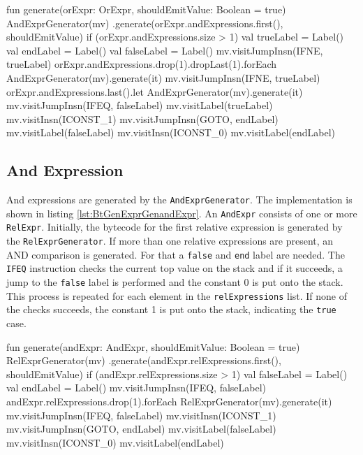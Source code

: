 \begin{KotlinCode}[float,numbers=none,caption=Implementation of the \texttt{generate} method of the \texttt{OrExprGenerator}., label=lst:BtGenExprGenOrExpr]
fun generate(orExpr: OrExpr, shouldEmitValue: Boolean = true) {
    AndExprGenerator(mv)
        .generate(orExpr.andExpressions.first(), shouldEmitValue)
    if (orExpr.andExpressions.size > 1) {
        val trueLabel = Label()
        val endLabel = Label()
        val falseLabel = Label()
        mv.visitJumpInsn(IFNE, trueLabel)
        orExpr.andExpressions.drop(1).dropLast(1).forEach {
            AndExprGenerator(mv).generate(it)
            mv.visitJumpInsn(IFNE, trueLabel)
        }
        orExpr.andExpressions.last().let {
            AndExprGenerator(mv).generate(it)
            mv.visitJumpInsn(IFEQ, falseLabel)
        }
        mv.visitLabel(trueLabel)
        mv.visitInsn(ICONST_1)
        mv.visitJumpInsn(GOTO, endLabel)
        mv.visitLabel(falseLabel)
        mv.visitInsn(ICONST_0)
        mv.visitLabel(endLabel)
    }
}
\end{KotlinCode}


\subsection{And Expression}

And expressions are generated by the \verb|AndExprGenerator|. The implementation is shown in listing \ref{lst:BtGenExprGenandExpr}. An \verb|AndExpr| consists of one or more \verb|RelExpr|. Initially, the bytecode for the first relative expression is generated by the \verb|RelExprGenerator|. If more than one relative expressions are present, an AND comparison is generated. For that a \verb|false| and \verb|end| label are needed. The \verb|IFEQ| instruction checks the current top value on the stack and if it succeeds, a jump to the \verb|false| label is performed and the constant 0 is put onto the stack. This process is repeated for each element in the \verb|relExpressions| list. If none of the checks succeeds, the constant 1 is put onto the stack, indicating the \verb|true| case. 

\begin{KotlinCode}[float,numbers=none,caption=Implementation of the \texttt{generate} method of the \texttt{AndExprGenerator}., label=lst:BtGenExprGenandExpr]
fun generate(andExpr: AndExpr, shouldEmitValue: Boolean = true) {
    RelExprGenerator(mv)
        .generate(andExpr.relExpressions.first(), shouldEmitValue)
    if (andExpr.relExpressions.size > 1) {
        val falseLabel = Label()
        val endLabel = Label()
        mv.visitJumpInsn(IFEQ, falseLabel)
        andExpr.relExpressions.drop(1).forEach {
            RelExprGenerator(mv).generate(it)
            mv.visitJumpInsn(IFEQ, falseLabel)
        }
        mv.visitInsn(ICONST_1)
        mv.visitJumpInsn(GOTO, endLabel)
        mv.visitLabel(falseLabel)
        mv.visitInsn(ICONST_0)
        mv.visitLabel(endLabel)
    }
}
\end{KotlinCode}

